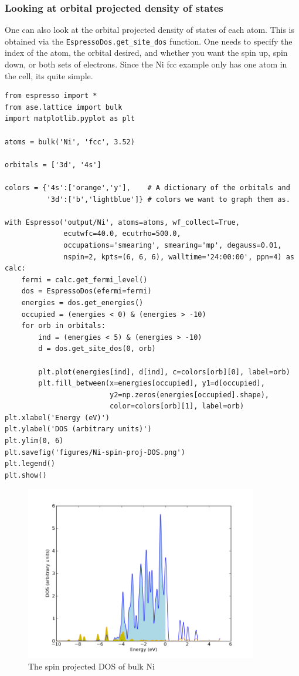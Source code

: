 \documentclass[colorlinks=true,urlcolor=blue,linkcolor=blue,citecolor=red]{article}
\begin{document}
\subsubsection{Looking at orbital projected density of states}
\label{sec-3-2-3}
One can also look at the orbital projected density of states of each atom. This is obtained via the \texttt{EspressoDos.get\_site\_dos} function. One needs to specify the index of the atom, the orbital desired, and whether you want the spin up, spin down, or both sets of electrons. Since the Ni fcc example only has one atom in the cell, its quite simple.

\begin{verbatim}
from espresso import *
from ase.lattice import bulk
import matplotlib.pyplot as plt

atoms = bulk('Ni', 'fcc', 3.52)

orbitals = ['3d', '4s']

colors = {'4s':['orange','y'],    # A dictionary of the orbitals and
          '3d':['b','lightblue']} # colors we want to graph them as.

with Espresso('output/Ni', atoms=atoms, wf_collect=True,
              ecutwfc=40.0, ecutrho=500.0,
              occupations='smearing', smearing='mp', degauss=0.01,
              nspin=2, kpts=(6, 6, 6), walltime='24:00:00', ppn=4) as calc:
    fermi = calc.get_fermi_level()
    dos = EspressoDos(efermi=fermi)
    energies = dos.get_energies()
    occupied = (energies < 0) & (energies > -10)
    for orb in orbitals:
        ind = (energies < 5) & (energies > -10)
        d = dos.get_site_dos(0, orb)
        
        plt.plot(energies[ind], d[ind], c=colors[orb][0], label=orb)
        plt.fill_between(x=energies[occupied], y1=d[occupied], 
                         y2=np.zeros(energies[occupied].shape),
                         color=colors[orb][1], label=orb)
plt.xlabel('Energy (eV)')
plt.ylabel('DOS (arbitrary units)')
plt.ylim(0, 6)
plt.savefig('figures/Ni-spin-proj-DOS.png')
plt.legend()
plt.show()
\end{verbatim}

\begin{figure}[H]
\centering
\includegraphics[width=4in]{./figures/Ni-spin-proj-DOS.png}
\caption{The spin projected DOS of bulk Ni}
\end{figure}
\end{document}
